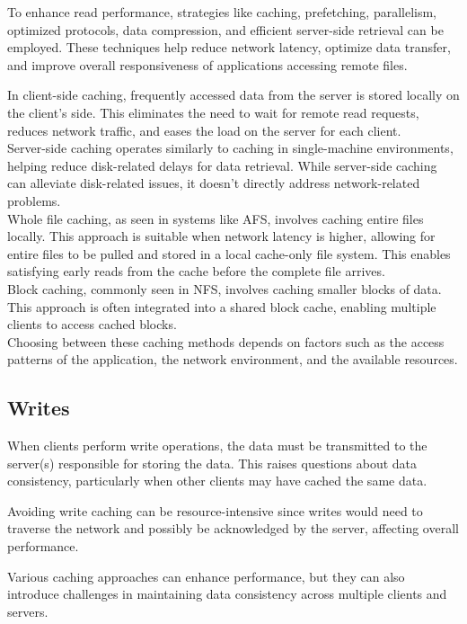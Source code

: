 \documentclass{report}
\newcommand{\asideBegin}[1]{\begin{tcolorbox}[colback=orange!5!white,colframe=black!75!orange,title={Aside:
      #1}]}
\newcommand{\asideEnd}{\end{tcolorbox}}
\begin{document}
To enhance read performance, strategies like caching, prefetching, parallelism, optimized
protocols, data compression, and efficient server-side retrieval can be employed. These techniques
help reduce network latency, optimize data transfer, and improve overall responsiveness of
applications accessing remote files.

\asideBegin{Caching}
In client-side caching, frequently accessed data from the server is stored locally on the client's
side. This eliminates the need to wait for remote read requests, reduces network traffic, and eases
the load on the server for each client. \\

Server-side caching operates similarly to caching in single-machine environments, helping reduce
disk-related delays for data retrieval. While server-side caching can alleviate disk-related issues,
it doesn't directly address network-related problems. \\

Whole file caching, as seen in systems like AFS, involves caching entire files locally. This
approach is suitable when network latency is higher, allowing for entire files to be pulled and
stored in a local cache-only file system. This enables satisfying early reads from the cache before
the complete file arrives. \\

Block caching, commonly seen in NFS, involves caching smaller blocks of data. This approach is often
integrated into a shared block cache, enabling multiple clients to access cached blocks. \\

Choosing between these caching methods depends on factors such as the access patterns of the
application, the network environment, and the available resources.
\asideEnd


\subsection{Writes}
When clients perform write operations, the data must be transmitted to the server(s) responsible for
storing the data. This raises questions about data consistency, particularly when other clients may
have cached the same data.

Avoiding write caching can be resource-intensive since writes would need to traverse the network and
possibly be acknowledged by the server, affecting overall performance.

Various caching approaches can enhance performance, but they can also introduce challenges in
maintaining data consistency across multiple clients and servers.
\end{document}
